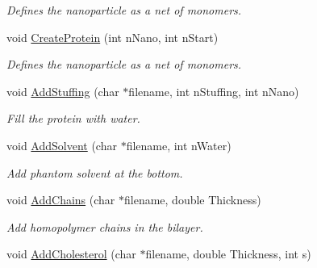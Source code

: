 \begin{DoxyCompactItemize}
\begin{DoxyCompactList}\small\item\em Defines the nanoparticle as a net of monomers. \end{DoxyCompactList}\item 
void \hyperlink{classVarData_abe734412a2e68af1fe7ab2a9e1ab33c2}{Create\+Protein} (int n\+Nano, int n\+Start)\hypertarget{classVarData_abe734412a2e68af1fe7ab2a9e1ab33c2}{}\label{classVarData_abe734412a2e68af1fe7ab2a9e1ab33c2}

\begin{DoxyCompactList}\small\item\em Defines the nanoparticle as a net of monomers. \end{DoxyCompactList}\item 
void \hyperlink{classVarData_a50fbab23bda1928d73e1c560e3316520}{Add\+Stuffing} (char $\ast$filename, int n\+Stuffing, int n\+Nano)\hypertarget{classVarData_a50fbab23bda1928d73e1c560e3316520}{}\label{classVarData_a50fbab23bda1928d73e1c560e3316520}

\begin{DoxyCompactList}\small\item\em Fill the protein with water. \end{DoxyCompactList}\item 
void \hyperlink{classVarData_a13774b113731faa29ab68cebe64835e6}{Add\+Solvent} (char $\ast$filename, int n\+Water)\hypertarget{classVarData_a13774b113731faa29ab68cebe64835e6}{}\label{classVarData_a13774b113731faa29ab68cebe64835e6}

\begin{DoxyCompactList}\small\item\em Add phantom solvent at the bottom. \end{DoxyCompactList}\item 
void \hyperlink{classVarData_aa1cf6c8bbac3409cb22b55450bcf1aad}{Add\+Chains} (char $\ast$filename, double Thickness)\hypertarget{classVarData_aa1cf6c8bbac3409cb22b55450bcf1aad}{}\label{classVarData_aa1cf6c8bbac3409cb22b55450bcf1aad}

\begin{DoxyCompactList}\small\item\em Add homopolymer chains in the bilayer. \end{DoxyCompactList}\item 
void \hyperlink{classVarData_a16aa5c5de066f24fa1f598d2a460f353}{Add\+Cholesterol} (char $\ast$filename, double Thickness, int s)\hypertarget{classVarData_a16aa5c5de066f24fa1f598d2a460f353}{}\label{classVarData_a16aa5c5de066f24fa1f598d2a460f353}


\end{DoxyCompactItemize}
